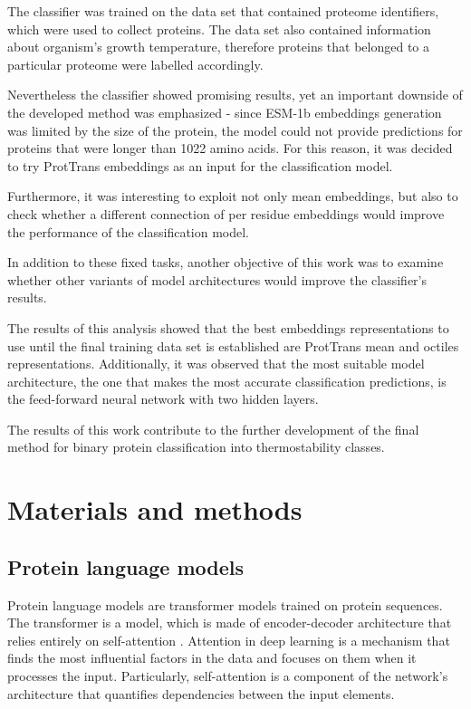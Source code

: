 \documentclass[12pt]{article}
\begin{document}
    The classifier was trained on the data set 
	\cite{engqvist_martin_karl_magnus_2018_1175609} that contained 
	proteome identifiers, which were used 
    to collect proteins. The data set also contained information 
	about organism's growth temperature, therefore proteins that 
	belonged to a particular proteome were labelled accordingly. 

    Nevertheless the classifier showed promising results, yet an
    important downside of the developed method was emphasized -
    since ESM-1b embeddings generation was limited by the size 
    of the protein, the model could not provide predictions for 
    proteins that were longer than 1022 amino acids. For this 
    reason, it was decided to try ProtTrans 
	\cite{elnaggar2020prottrans} embeddings as an 
    input for the classification model.

    Furthermore, it was interesting to exploit not only mean 
    embeddings, but also to check whether a different 
    connection of per residue embeddings would improve the 
    performance of the classification model.

    In addition to these fixed tasks, another objective of 
	this work was to examine whether other variants of model
	architectures would improve the classifier's results.

	The results of this analysis showed that the best embeddings 
	representations to use until the final training data set is 
	established are ProtTrans mean and octiles representations. 
	Additionally, it was observed that the most suitable model 
	architecture, the one that makes the most accurate classification
	predictions, is the feed-forward 
	neural network with two hidden layers.

    The results of this work contribute to the further development of
	the final method for binary protein classification into 
	thermostability classes.

	\normalsize
	
	\newpage

	\section{Materials and methods}

	\subsection{Protein language models}

	Protein language models are transformer models trained on protein sequences.
	The transformer is a model, which is made of encoder-decoder architecture 
	that relies entirely on self-attention \cite{vaswani2017attention}. 
	Attention in deep learning is a mechanism that finds the most influential
	factors in the data and focuses on them when it processes the input. 
	Particularly, self-attention is a component of the network's architecture
	that quantifies dependencies between the input elements.
\end{document}
